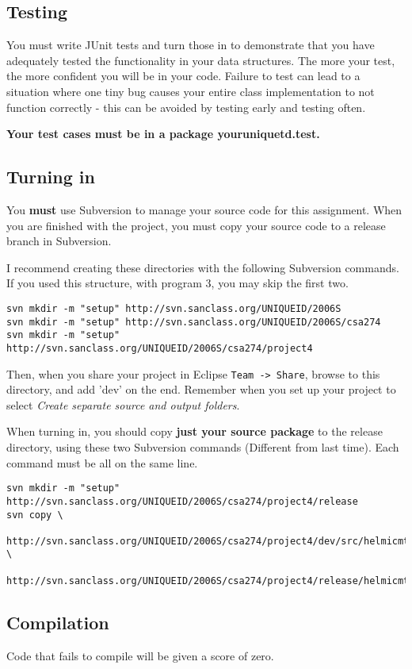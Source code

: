 \documentclass[11pt]{article}
\begin{document}
\subsection*{Testing}
You must write JUnit tests and turn those in to demonstrate that you have adequately tested the functionality in your data structures.   The more your test, the more confident you will be in your code.  Failure to test can lead to a situation where one tiny bug causes your entire class implementation to not function correctly - this can be avoided by testing early and testing often.
\par
{\bf Your test cases must be in a package youruniquetd.test.}

\subsection*{Turning in}
You {\bf must} use Subversion to manage your source code for this assignment.   When you are finished with the project, you must copy your source code to a release branch in Subversion.
\par
I recommend creating these directories with the following Subversion commands.  If you used this structure, with program 3, you may skip the first two.
\begin{verbatim}
svn mkdir -m "setup" http://svn.sanclass.org/UNIQUEID/2006S
svn mkdir -m "setup" http://svn.sanclass.org/UNIQUEID/2006S/csa274
svn mkdir -m "setup" http://svn.sanclass.org/UNIQUEID/2006S/csa274/project4
\end{verbatim}
\par
Then, when you share your project in Eclipse {\tt Team -> Share}, browse to this directory, and add 'dev' on the end.   Remember when you set up your project to select {\it Create separate source and output folders}.
\par
When turning in, you should copy {\bf just your source package} to the release directory, using these two Subversion commands (Different from last time).  Each command must be all on the same line.
\begin{verbatim}
svn mkdir -m "setup" http://svn.sanclass.org/UNIQUEID/2006S/csa274/project4/release
svn copy \
  http://svn.sanclass.org/UNIQUEID/2006S/csa274/project4/dev/src/helmicmt \
  http://svn.sanclass.org/UNIQUEID/2006S/csa274/project4/release/helmicmt
\end{verbatim}

\subsection*{Compilation}
Code that fails to compile will be given a score of zero.
\end{document}
